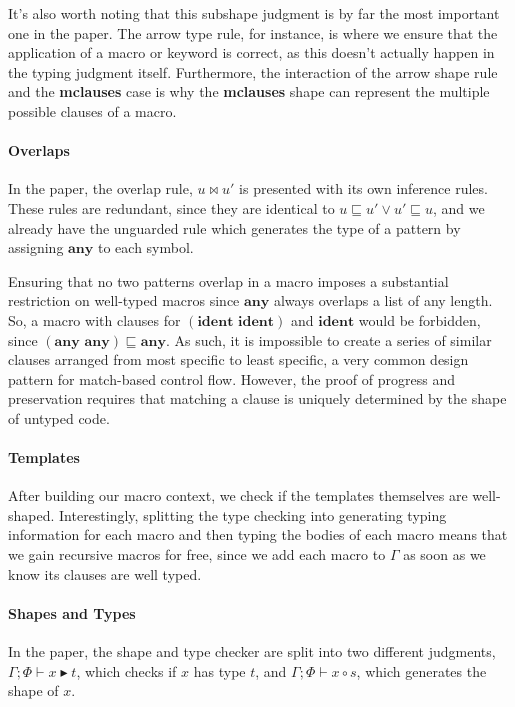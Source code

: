 \documentclass[11pt]{article}
\begin{document}
It's also worth noting that this subshape judgment is by far the most important one in the paper. The arrow type rule, for instance, is where we ensure that the application of a macro or keyword is correct, as this doesn't actually happen in the typing judgment itself. Furthermore, the interaction of the arrow shape rule and the \textbf{mclauses} case is why the \textbf{mclauses} shape can represent the multiple possible clauses of a macro. 

\paragraph{Overlaps}
In the paper, the overlap rule, $u \bowtie u'$ is presented with its own inference rules. These rules are redundant, since they are identical to $u \sqsubseteq u' \vee u' \sqsubseteq u$, and we already have the unguarded rule which generates the type of a pattern by assigning $\textbf{any}$ to each symbol. 

Ensuring that no two patterns overlap in a macro imposes a substantial restriction on well-typed macros since $\textbf{any}$ always overlaps a list of any length. So, a macro with clauses for $(\textbf{ident ident})$ and $\textbf{ident}$ would be forbidden, since $(\textbf{any any}) \sqsubseteq \textbf{any}$. As such, it is impossible to create a series of similar clauses arranged from most specific to least specific, a very common design pattern for match-based control flow. However, the proof of progress and preservation requires that matching a clause is uniquely determined by the shape of untyped code.

\paragraph{Templates} After building our macro context, we check if the templates themselves are well-shaped. Interestingly, splitting the type checking into generating typing information for each macro and then typing the bodies of each macro means that we gain recursive macros for free, since we add each macro to $\Gamma$ as soon as we know its clauses are well typed. 

\paragraph{Shapes and Types} In the paper, the shape and type checker are split into two different judgments, $\Gamma;\Phi \vdash x \blacktriangleright t$, which checks if $x$ has type $t$, and $\Gamma;\Phi \vdash x \circ s$, which generates the shape of $x$. 
\end{document}
